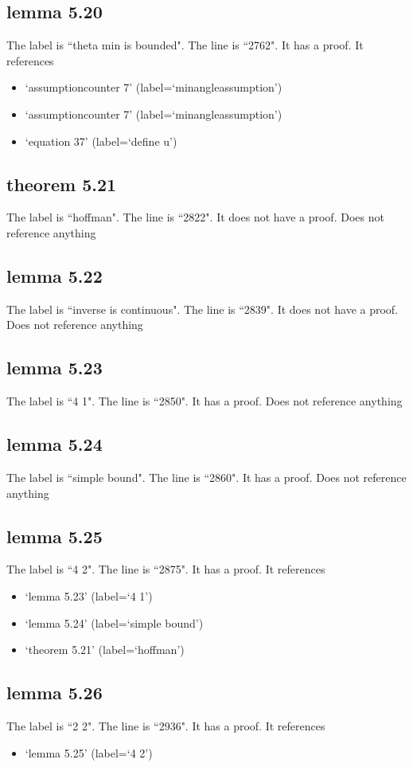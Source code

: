 \documentclass{article}
\begin{document}
\subsection{lemma 5.20}
The label is ``theta min is bounded".
The line is ``2762".
It has a proof.
It references \begin{itemize}
\item `assumptioncounter 7' (label=`minangleassumption')
\item `assumptioncounter 7' (label=`minangleassumption')
\item `equation 37' (label=`define u')
\end{itemize}
\subsection{theorem 5.21}
The label is ``hoffman".
The line is ``2822".
It does not have a proof.
Does not reference anything
\subsection{lemma 5.22}
The label is ``inverse is continuous".
The line is ``2839".
It does not have a proof.
Does not reference anything
\subsection{lemma 5.23}
The label is ``4 1".
The line is ``2850".
It has a proof.
Does not reference anything
\subsection{lemma 5.24}
The label is ``simple bound".
The line is ``2860".
It has a proof.
Does not reference anything
\subsection{lemma 5.25}
The label is ``4 2".
The line is ``2875".
It has a proof.
It references \begin{itemize}
\item `lemma 5.23' (label=`4 1')
\item `lemma 5.24' (label=`simple bound')
\item `theorem 5.21' (label=`hoffman')
\end{itemize}
\subsection{lemma 5.26}
The label is ``2 2".
The line is ``2936".
It has a proof.
It references \begin{itemize}
\item `lemma 5.25' (label=`4 2')
\end{itemize}
\end{document}

